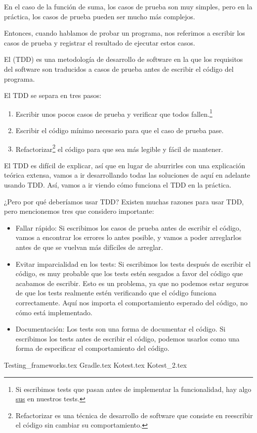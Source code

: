   En el caso de la función de suma, los casos de prueba son muy simples, pero en la práctica, los
  casos de prueba pueden ser mucho más complejos.

  Entonces, cuando hablamos de probar un programa, nos referimos a escribir los casos de prueba y
  registrar el resultado de ejecutar estos casos.

  \begin{defaultbox}
    El  (TDD) es una metodología de desarrollo de software en la que
    los requisitos del software son traducidos a casos de prueba antes de escribir el código del
    programa.
  \end{defaultbox}

  El TDD se separa en tres pasos:

  \begin{enumerate}
    \item Escribir unos pocos casos de prueba y verificar que todos fallen.\footnote{
        Si escribimos tests que pasan antes de implementar la funcionalidad, hay algo 
        \href{https://www.merriam-webster.com/words-at-play/what-does-sus-mean}{sus} en nuestros 
        tests.
      }
    \item Escribir el código mínimo necesario para que el caso de prueba pase.
    \item Refactorizar\footnote{
      Refactorizar es una técnica de desarrollo de software que consiste en reescribir el código sin 
      cambiar su comportamiento.
    } el código para que sea más legible y fácil de mantener.
  \end{enumerate}

  El TDD es difícil de explicar, así que en lugar de aburrirles con una explicación teórica extensa,
  vamos a ir desarrollando todas las soluciones de aquí en adelante usando TDD.
  Así, vamos a ir viendo cómo funciona el TDD en la práctica.

  ¿Pero por qué deberíamos usar TDD?
  Existen muchas razones para usar TDD, pero mencionemos tres que considero importante:

  \begin{itemize}
    \item Fallar rápido: Si escribimos los casos de prueba antes de escribir el código, vamos a
      encontrar los errores lo antes posible, y vamos a poder arreglarlos antes de que se vuelvan
      más difíciles de arreglar.
    \item Evitar imparcialidad en los tests: Si escribimos los tests después de escribir el código,
      es muy probable que los tests estén sesgados a favor del código que acabamos de escribir.
      Esto es un problema, ya que no podemos estar seguros de que los tests realmente estén
      verificando que el código funciona correctamente.
      Aquí nos importa el comportamiento esperado del código, no cómo está implementado.
    \item Documentación: Los tests son una forma de documentar el código.
      Si escribimos los tests antes de escribir el código, podemos usarlos como una forma de
      especificar el comportamiento del código.
  \end{itemize}

  {Testing_frameworks.tex}
  {Gradle.tex}
  {Kotest.tex}
  {Kotest_2.tex}
  
  \printbibliography[keyword=tdd]